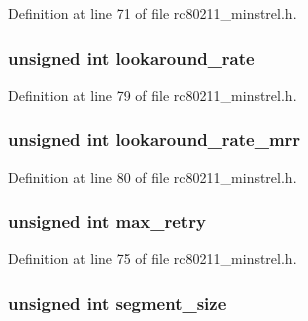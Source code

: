 Definition at line 71 of file rc80211\-\_\-minstrel.\-h.

\hypertarget{structminstrel__priv_a663907806648ad048461b7d164a15632}{
\subsubsection[{lookaround\-\_\-rate}]{\setlength{\rightskip}{0pt plus 5cm}unsigned int lookaround\-\_\-rate}}\label{structminstrel__priv_a663907806648ad048461b7d164a15632}


Definition at line 79 of file rc80211\-\_\-minstrel.\-h.

\hypertarget{structminstrel__priv_a4b6e6fdf3f72ff420da912ed94ee8086}{
\subsubsection[{lookaround\-\_\-rate\-\_\-mrr}]{\setlength{\rightskip}{0pt plus 5cm}unsigned int lookaround\-\_\-rate\-\_\-mrr}}\label{structminstrel__priv_a4b6e6fdf3f72ff420da912ed94ee8086}


Definition at line 80 of file rc80211\-\_\-minstrel.\-h.

\hypertarget{structminstrel__priv_adab4257a07e2dc9f570cdd27160d9608}{
\subsubsection[{max\-\_\-retry}]{\setlength{\rightskip}{0pt plus 5cm}unsigned int max\-\_\-retry}}\label{structminstrel__priv_adab4257a07e2dc9f570cdd27160d9608}


Definition at line 75 of file rc80211\-\_\-minstrel.\-h.

\hypertarget{structminstrel__priv_a2d3f8a202a939940631624d4df515a8b}{
\subsubsection[{segment\-\_\-size}]{\setlength{\rightskip}{0pt plus 5cm}unsigned int segment\-\_\-size}}\label{structminstrel__priv_a2d3f8a202a939940631624d4df515a8b}


